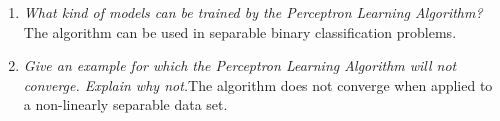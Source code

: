 \documentclass[onecolumn]{article}
\begin{document}
\begin{enumerate}
\begin{enumerate}
		\item \textit{What kind of models can be trained by the Perceptron Learning Algorithm?}\newline The algorithm can be used in separable binary classification problems.
		\item \textit{Give an example for which the Perceptron Learning Algorithm will not converge. Explain why not.}\newline The algorithm does not converge when applied to a non-linearly separable data set.
	\end{enumerate}	
\end{enumerate}

\nocite{*}

\end{document}
